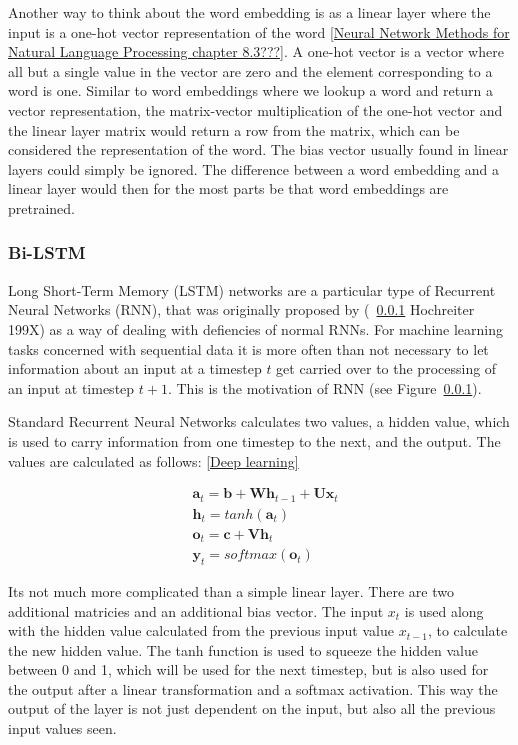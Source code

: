 Another way to think about the word embedding is as a linear layer where the
input is a one-hot vector representation of the word \ref{Neural Network Methods
for Natural Language Processing chapter 8.3???}. A one-hot vector is a vector
where all but a single value in the vector are zero and the element
corresponding to a word is one. Similar to word embeddings where we lookup a
word and return a vector representation, the matrix-vector multiplication of the
one-hot vector and the linear layer matrix would return a row from the matrix,
which can be considered the representation of the word. The bias vector usually
found in linear layers could simply be ignored. The difference between a word
embedding and a linear layer would then for the most parts be that word
embeddings are pretrained.

\subsubsection{Bi-LSTM}

Long Short-Term Memory (LSTM) networks are a particular type of Recurrent Neural
Networks (RNN), that was originally proposed by (~\ref{} Hochreiter 199X) as a
way of dealing with defiencies of normal RNNs. For machine learning tasks
concerned with sequential data it is more often than not necessary to let
information about an input at a timestep $t$ get carried over to the processing
of an input at timestep $t+1$. This is the motivation of RNN (see
Figure~\ref{}).

Standard Recurrent Neural Networks calculates two values, a hidden value, which
is used to carry information from one timestep to the next, and the output. The
values are calculated as follows: \ref{Deep learning}

\begin{align*}
    & \textbf{a}_t = \textbf{b} + \textbf{W} \textbf{h}_{t-1} + \textbf{U} \textbf{x}_t \\
    & \textbf{h}_t = tanh(\textbf{a}_t) \\
    & \textbf{o}_t = \textbf{c} + \textbf{V} \textbf{h}_t \\
    & \textbf{y}_t = softmax(\textbf{o}_t)
\end{align*}

Its not much more complicated than a simple linear layer. There are two
additional matricies and an additional bias vector. The input $x_t$ is used
along with the hidden value calculated from the previous input value $x_{t-1}$,
to calculate the new hidden value. The tanh function is used to squeeze the
hidden value between 0 and 1, which will be used for the next timestep, but is
also used for the output after a linear transformation and a softmax activation.
This way the output of the layer is not just dependent on the input, but also
all the previous input values seen.

